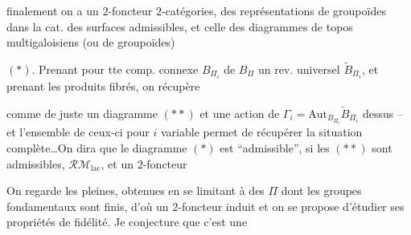  finalement on a un $2$-foncteur   $2$-catégories,  des représentations de groupoïdes dans la cat. des surfaces admissibles, et celle des diagrammes de topos multigaloisiens (ou de groupoïdes)

$(*)$. Prenant pour tte comp. connexe $B_{\Pi_i}$ de $B_\Pi$ un rev. universel $\widetilde B_{\Pi_i}$, et prenant les produits fibrés, on récupère

comme de juste un diagramme
$(**)$
et une action de $\Gamma_i=\mathrm{Aut}_{B_{\Pi_i}}\widetilde B_{\Pi_i}$ dessus -- et l'ensemble de ceux-ci pour $i$ variable permet de récupérer la situation complète\ldots On dira que le diagramme $(*)$ est ``admissible'', si les  $(**)$ sont admissibles,     $\mathcal{RM}_{\mathrm{lac}}$, et un $2$-foncteur

On regarde les   pleines, obtenues en se limitant à des $\Pi$ dont les groupes fondamentaux sont finis, d'où un $2$-foncteur induit
et on se propose d'étudier ses propriétés de fidélité. Je conjecture que c'est une
